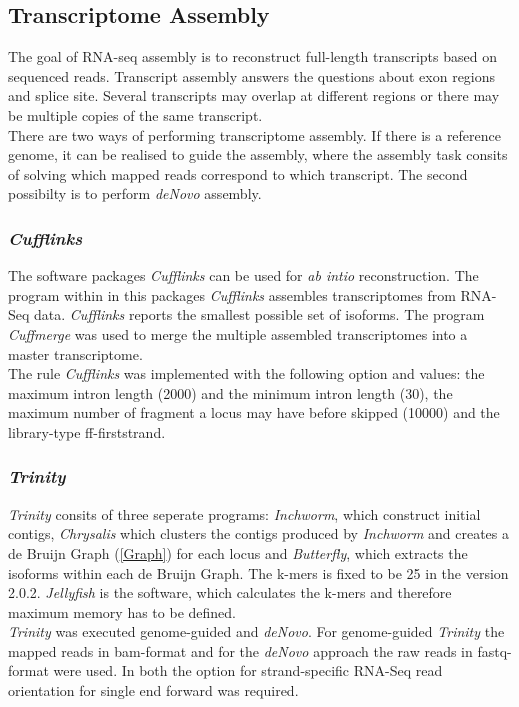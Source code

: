 \documentclass[12pt, a4paper]{report}
\begin{document}
\subsection*{Transcriptome Assembly}
The goal of RNA-seq assembly is to reconstruct full-length transcripts based on sequenced reads. Transcript assembly answers the questions about exon regions and splice site. Several transcripts may overlap at different regions or there may be multiple copies of the same transcript. \\
There are two ways of performing transcriptome assembly. If there is a reference genome, it can be realised to guide the assembly, where the assembly task consits of solving which mapped reads correspond to which transcript. The second possibilty is to perform \textit{deNovo} assembly. \cite{Korpelainen2014} 

\subsubsection*{\textit{Cufflinks}}
The software packages \textit{Cufflinks} can be used for \textit{ab intio} reconstruction. The program within in this packages \textit{Cufflinks} assembles transcriptomes from RNA-Seq data. \textit{Cufflinks} reports the smallest possible set of isoforms. The program \textit{Cuffmerge} was used to merge the multiple assembled transcriptomes into a master transcriptome. \cite{Trapnell2010} \\
The rule \textit{Cufflinks} was implemented with the following option and values: the maximum intron length (2000) and the minimum intron length (30), the maximum number of fragment a locus may have before skipped (10000) and the library-type ff-firststrand.

\subsubsection*{\textit{Trinity}}
\textit{Trinity} consits of three seperate programs: \textit{Inchworm}, which construct initial contigs, \textit{Chrysalis} which clusters the contigs produced by \textit{Inchworm} and creates a de Bruijn Graph (\ref{Graph}) for each locus and \textit{Butterfly}, which extracts the isoforms within each de Bruijn Graph. The k-mers is fixed to be 25 in the version 2.0.2.
\textit{Jellyfish} is the software, which calculates the k-mers and therefore maximum memory has to be defined. \cite{Grabherr2013} \\
\textit{Trinity} was executed genome-guided and \textit{deNovo}. For genome-guided \textit{Trinity} the mapped reads in bam-format and for the \textit{deNovo} approach the raw reads in fastq-format were used. In both the option for strand-specific RNA-Seq read orientation for single end forward was required. 
\end{document}
